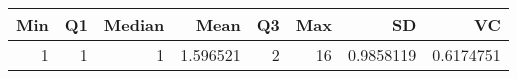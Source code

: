 
\begin{tabular}[t]{rrrrrrrr}
\toprule
Min & Q1 & Median & Mean & Q3 & Max & SD & VC\\
\midrule
1 & 1 & 1 & 1.596521 & 2 & 16 & 0.9858119 & 0.6174751\\
\bottomrule
\end{tabular}